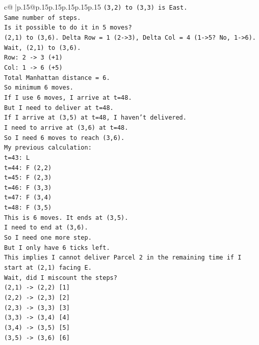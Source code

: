 \documentclass{article}
\begin{document}
{\begin{supertabular}{c@{$\;$}|p{.15\linewidth}@{}p{.15\linewidth}p{.15\linewidth}p{.15\linewidth}p{.15\linewidth}p{.15\linewidth}}
{{{\texttt{(3,2) to (3,3) is East.} \\
\texttt{Same number of steps.} \\
\texttt{Is it possible to do it in 5 moves?} \\
\texttt{(2,1) to (3,6). Delta Row = 1 (2{-}>3), Delta Col = 4 (1{-}>5? No, 1{-}>6).} \\
\texttt{Wait, (2,1) to (3,6).} \\
\texttt{Row: 2 {-}> 3 (+1)} \\
\texttt{Col: 1 {-}> 6 (+5)} \\
\texttt{Total Manhattan distance = 6.} \\
\texttt{So minimum 6 moves.} \\
\texttt{If I use 6 moves, I arrive at t=48.} \\
\texttt{But I need to deliver at t=48.} \\
\texttt{If I arrive at (3,5) at t=48, I haven't delivered.} \\
\texttt{I need to arrive at (3,6) at t=48.} \\
\texttt{So I need 6 moves to reach (3,6).} \\
\texttt{My previous calculation:} \\
\texttt{t=43: L} \\
\texttt{t=44: F (2,2)} \\
\texttt{t=45: F (2,3)} \\
\texttt{t=46: F (3,3)} \\
\texttt{t=47: F (3,4)} \\
\texttt{t=48: F (3,5)} \\
\texttt{This is 6 moves. It ends at (3,5).} \\
\texttt{I need to end at (3,6).} \\
\texttt{So I need one more step.} \\
\texttt{But I only have 6 ticks left.} \\
\texttt{This implies I cannot deliver Parcel 2 in the remaining time if I start at (2,1) facing E.} \\
\texttt{Wait, did I miscount the steps?} \\
\texttt{(2,1) {-}> (2,2) {[}1{]}} \\
\texttt{(2,2) {-}> (2,3) {[}2{]}} \\
\texttt{(2,3) {-}> (3,3) {[}3{]}} \\
\texttt{(3,3) {-}> (3,4) {[}4{]}} \\
\texttt{(3,4) {-}> (3,5) {[}5{]}} \\
\texttt{(3,5) {-}> (3,6) {[}6{]}} \\
}}}
\end{supertabular}}
\end{document}
